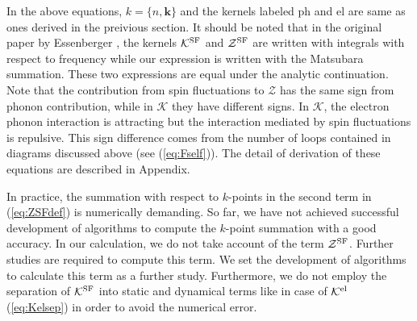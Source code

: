 %
In the above equations, $k = \{n,\bm k \}$ and the kernels labeled ph and el are same as ones
derived in the preivious section. It should be noted that in the original paper by Essenberger
\cite{Essenberger2014}, the kernels $\mathcal K^{\rm SF}$ and $\mathcal Z^{\rm SF}$ are written 
with integrals with respect to frequency while our expression is written with the Matsubara summation.
These two expressions are equal under the analytic continuation.
Note that the contribution from spin fluctuations to $\mathcal Z$
has the same sign from phonon contribution, while in $\mathcal K$ they have different signs.
In $\mathcal K$, the electron phonon interaction is attracting but the interaction mediated by
spin fluctuations is repulsive.
This sign difference comes from the number of loops contained in diagrams discussed above
(see (\ref{eq:Fself})). The detail of derivation of these equations are described in Appendix.

In practice, the summation with respect to $k$-points in the second term in 
(\ref{eq:ZSFdef}) is numerically demanding.
So far, we have not achieved successful development of algorithms to compute the $k$-point summation 
with a good accuracy. In our calculation, we do not take account of the term $\mathcal Z^{\rm SF}$.
Further studies are required to compute this term.
We set the development of algorithms to calculate this term as a further study.
Furthermore, we do not employ the separation of $\mathcal K^{\rm SF}$ into static and dynamical
terms like in case of $\mathcal K^{\rm el}$ (\ref{eq:Kelsep}) in order to avoid the numerical error.

